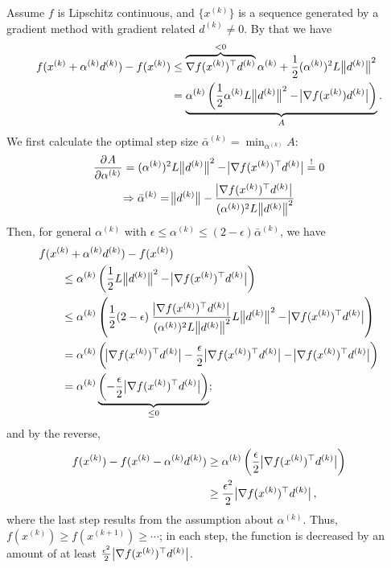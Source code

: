 \documentclass{article}
\newcommand{\T}[1]{#1^{\top}}
\newcommand{\kth}[2][k]{#2^{(#1)}}
\begin{document}
Assume \(f\) is Lipschitz continuous, and \(\{\kth{x}\}\) is a sequence generated by a gradient
method with gradient related \(\kth{d} \neq 0\).  By that we have
\begin{align*}
  f(\kth{x} + \kth{\alpha}\kth{d}) - f(\kth{x})
  &\leq \overbrace{\T{\nabla f(\kth{x})} \kth{d}}^{< 0} \kth{\alpha} +
    \frac{1}{2} (\kth{\alpha})^2 L \enVert[1]{\kth{d}}^2 \\
  &= \underbrace{\kth{\alpha} \left( \frac{1}{2} \kth{\alpha} L \enVert[1]{\kth{d}}^2
    - \envert[1]{\nabla f(\kth{x}) \kth{d}} \right)}_{A}.
\end{align*}
We first calculate the optimal step size \(\kth{\bar{\alpha}} = \min_{\kth{\alpha}} A\):
\begin{gather*}
  \dpd{A}{{\kth{\alpha}}} = (\kth{\alpha})^2 L \enVert[1]{\kth{d}}^2 - \envert[1]{\T{\nabla
                            f(\kth{x})} \kth{d}} \overset{!}{=} 0 \\
  \Rightarrow \kth{\bar{\alpha}} = \enVert[1]{\kth{d}} - \frac{\envert[1]{\T{\nabla
                       f(\kth{x})} \kth{d}}}{(\kth{\alpha})^2 L \enVert[1]{\kth{d}}^2}
\end{gather*}
Then, for general \(\kth{\alpha}\) with
\(\epsilon \leq \kth{\alpha} \leq (2 - \epsilon)\kth{\bar{\alpha}}\), we have
\begin{align*}
  &f(\kth{x} + \kth{\alpha}\kth{d}) - f(\kth{x}) \\
  &\qquad \leq \kth{\alpha} \left( \frac{1}{2} L \enVert[1]{\kth{d}}^2
    - \envert[1]{\T{\nabla f(\kth{x})} \kth{d}} \right) \\
  &\qquad \leq \kth{\alpha} \left( \frac{1}{2} (2 - \epsilon)\; \frac{\envert[1]{\T{\nabla
    f(\kth{x})} \kth{d}}}{(\kth{\alpha})^2 L \enVert[1]{\kth{d}}^2} L \enVert[1]{\kth{d}}^2
    - \envert[1]{\T{\nabla f(\kth{x})} \kth{d}} \right) \\
  &\qquad = \kth{\alpha} \left( \envert[1]{\T{\nabla f(\kth{x})} \kth{d}}
    - \frac{\epsilon}{2} \envert[1]{\T{\nabla f(\kth{x})} \kth{d}}
    - \envert[1]{\T{\nabla f(\kth{x})} \kth{d}} \right) \\
  &\qquad = \kth{\alpha} \underbrace{\left( -\frac{\epsilon}{2}\envert[1]{\T{\nabla f(\kth{x})} \kth{d}}
    \right)}_{\leq 0};
\end{align*}
and by the reverse,
\begin{align*}
  f(\kth{x}) - f(\kth{x} - \kth{\alpha}\kth{d})
  &\geq \kth{\alpha} \left(\frac{\epsilon}{2}\envert[1]{\T{\nabla f(\kth{x})} \kth{d}} \right) \\
  &\geq \frac{\epsilon^2}{2}\envert[1]{\T{\nabla f(\kth{x})} \kth{d}},
\end{align*}
where the last step results from the assumption about \(\kth{\alpha}\).  Thus,
\(f(\kth{x}) \geq f(\kth[k+1]{x}) \geq \cdots \); in each step, the function is decreased by an
amount of at least \(\frac{\epsilon^2}{2}\envert[1]{\T{\nabla f(\kth{x})} \kth{d}}\).
\end{document}
